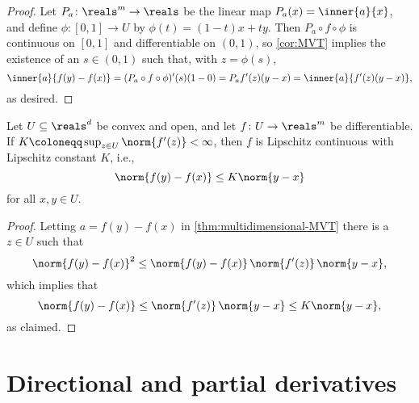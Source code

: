 \documentclass[article, a4paper, 11pt, oneside]{memoir}
\numberwithin{equation}{chapter}
\begin{document}
\begin{proof}
    Let $P_a \colon \reals^m \to \reals$ be the linear map $P_a(x) = \inner{a}{x}$, and define $\phi \colon [0,1] \to U$ by $\phi(t) = (1-t)x + ty$. Then $P_a \circ f \circ \phi$ is continuous on $[0,1]$ and differentiable on $(0,1)$, so \cref{cor:MVT} implies the existence of an $s \in (0,1)$ such that, with $z = \phi(s)$,
    \begin{equation*}
        \inner{a}{f(y) - f(x)}
            = (P_a \circ f \circ \phi)'(s)(1 - 0)
            = P_a f'(z) (y - x)
            = \inner{a}{f'(z)(y - x)},
    \end{equation*}
    as desired.
\end{proof}


\newcommand{\defeq}{\coloneqq}

\begin{corollary}
    Let $U \subseteq \reals^d$ be convex and open, and let $f \colon U \to \reals^m$ be differentiable. If $K \defeq \sup_{z \in U} \norm{f'(z)} < \infty$, then $f$ is Lipschitz continuous with Lipschitz constant $K$, i.e.,
    \begin{equation*}
        \norm{f(y) - f(x)}
            \leq K \norm{y - x}
    \end{equation*}
    for all $x,y \in U$.
\end{corollary}

\begin{proof}
    Letting $a = f(y) - f(x)$ in \cref{thm:multidimensional-MVT} there is a $z \in U$ such that
    \begin{equation*}
        \norm{f(y)-f(x)}^2
            \leq \norm{f(y) - f(x)} \, \norm{f'(z)} \, \norm{y - x},
    \end{equation*}
    which implies that
    \begin{equation*}
        \norm{f(y)-f(x)}
            \leq \norm{f'(z)} \, \norm{y - x}
            \leq K \norm{y - x},
    \end{equation*}
    as claimed.
\end{proof}


\section{Directional and partial derivatives}
\end{document}
